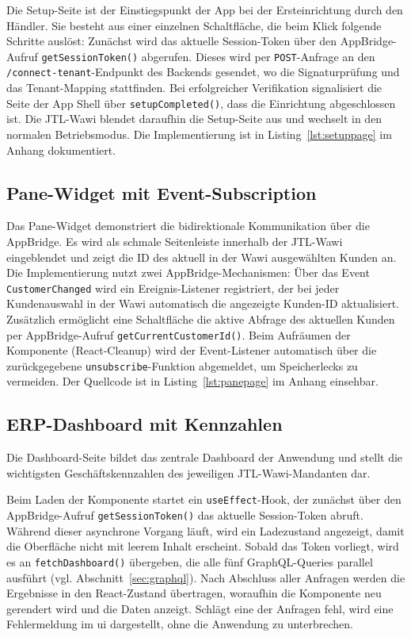 \documentclass[11pt, a4paper, oneside]{report}
\begin{document}
Die Setup-Seite ist der Einstiegspunkt der App bei der Ersteinrichtung durch den
Händler. Sie besteht aus einer einzelnen Schaltfläche, die beim Klick folgende
Schritte auslöst: Zunächst wird das aktuelle Session-Token über den AppBridge-Aufruf
\texttt{getSessionToken()} abgerufen. Dieses wird per \texttt{POST}-Anfrage an den
\texttt{/connect-tenant}-Endpunkt des Backends gesendet, wo die Signaturprüfung
und das Tenant-Mapping stattfinden. Bei erfolgreicher Verifikation signalisiert
die Seite der App Shell über \texttt{setupCompleted()}, dass
die Einrichtung abgeschlossen ist. Die JTL-Wawi blendet daraufhin die Setup-Seite
aus und wechselt in den normalen Betriebsmodus. Die Implementierung ist in
Listing~\ref{lst:setuppage} im Anhang dokumentiert.

\subsection{Pane-Widget mit Event-Subscription}

Das Pane-Widget demonstriert die bidirektionale Kommunikation über die AppBridge.
Es wird als schmale Seitenleiste innerhalb der JTL-Wawi eingeblendet und zeigt die
ID des aktuell in der Wawi ausgewählten Kunden an. Die Implementierung nutzt zwei
AppBridge-Mechanismen: Über das Event \texttt{CustomerChanged} wird ein
Ereignis-Listener registriert, der bei jeder Kundenauswahl in der Wawi
automatisch die angezeigte Kunden-ID aktualisiert. Zusätzlich ermöglicht eine
Schaltfläche die aktive Abfrage des aktuellen Kunden per AppBridge-Aufruf
\texttt{getCurrentCustomerId()}. Beim Aufräumen der Komponente
(React-Cleanup) wird der Event-Listener automatisch über die zurückgegebene
\texttt{unsubscribe}-Funktion abgemeldet, um Speicherlecks zu vermeiden.
Der Quellcode ist in Listing~\ref{lst:panepage} im Anhang einsehbar.

\subsection{ERP-Dashboard mit Kennzahlen}
\label{sec:erp-dashboard}

Die Dashboard-Seite bildet das zentrale Dashboard der Anwendung und stellt die
wichtigsten Geschäftskennzahlen des jeweiligen JTL-Wawi-Mandanten dar.

Beim Laden der Komponente startet ein \texttt{useEffect}-Hook, der zunächst
über den AppBridge-Aufruf \texttt{getSessionToken()} das aktuelle
Session-Token abruft. Während dieser asynchrone Vorgang läuft, wird ein
Ladezustand angezeigt, damit die Oberfläche nicht mit leerem Inhalt erscheint.
Sobald das Token vorliegt, wird es an \texttt{fetchDashboard()} übergeben,
die alle fünf GraphQL-Queries parallel ausführt (vgl.
Abschnitt~\ref{sec:graphql}). Nach Abschluss aller Anfragen werden die
Ergebnisse in den React-Zustand übertragen, woraufhin die Komponente neu
gerendert wird und die Daten anzeigt. Schlägt eine der Anfragen fehl,
wird eine Fehlermeldung im \gls{ui} dargestellt, ohne die Anwendung zu
unterbrechen.
\end{document}
